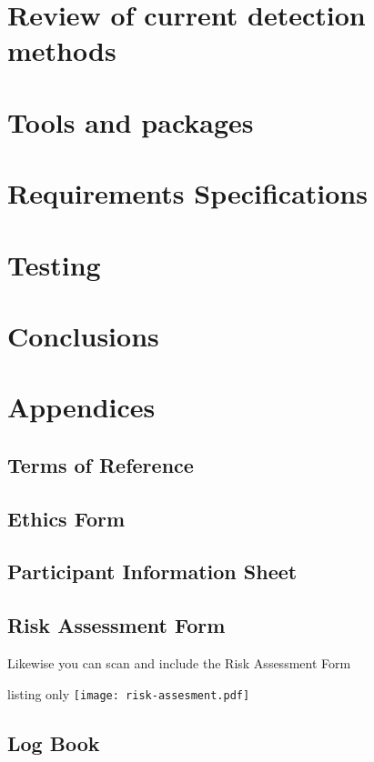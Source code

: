 \documentclass[10pt,twoside]{book}
\begin{document}
\frontmatter




\tableofcontents

\mainmatter

\part{Review of current detection methods}




\part{Tools and packages}
\part{Requirements Specifications}

\part{Testing}
\part{Conclusions}


\printbibliography
\part{Appendices}
\appendix
\chapter{Terms of Reference}
\chapter{Ethics Form}

\chapter{Participant Information Sheet}

\chapter{Risk Assessment Form}
Likewise you can scan and include the Risk Assessment Form
\begin{tcblisting}{listing only}
\texttt{[image: risk-assesment.pdf]}
\end{tcblisting}
\chapter{Log Book}

\end{document}
